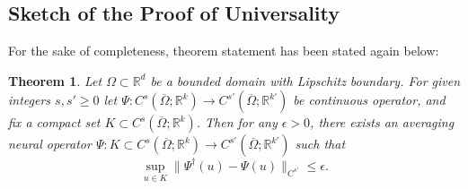 \documentclass[reqno]{amsart}
\theoremstyle{plain}
\newtheorem{thm}{Theorem}
\theoremstyle{definition}
\newcommand{\bb}[1]{\mathbb{#1}}
\begin{document}
\subsection{Sketch of the Proof of Universality}
For the sake of completeness, theorem statement has been stated again below:
\begin{thm}
    Let $\Omega \subset \bb R^d$ be a bounded domain with Lipschitz boundary. For given integers $s,s' \geq 0$ let $\Psi : C^s(\overline{\Omega};\bb R^k) \to C^{s'}(\overline{\Omega};\bb R^{k'})$ be continuous operator, and fix a compact set $K \subset C^s(\overline{\Omega};\bb R^k)$. Then for any $\epsilon > 0$, there exists an averaging neural operator $\Psi : K \subset C^s(\overline{\Omega};\bb R^k) \to C^{s'}(\overline{\Omega};\bb R^{k'})$ such that 
    $$ \sup\limits_{u \in K}\|\Psi^\dag (u) - \Psi(u)\|_{C^{s'}} \leq \epsilon.$$ 
\end{thm}
\appendix
\end{document}
